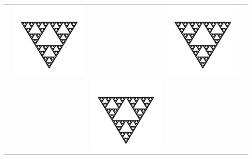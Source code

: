 \documentclass[letterpaper,12pt]{article}
\begin{document}
\begin{table}[h!]
\begin{tabular}{|ccccc|}
 & \includegraphics[angle=90,scale=0.32]{fractal} &  & \includegraphics[angle=90,scale=0.32]{fractal} & \\
 &  & \includegraphics[angle=60,scale=0.32]{fractal} &  & \\

\end{tabular}
\end{table}
\end{document}
